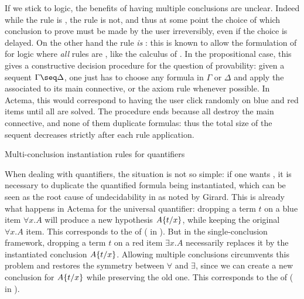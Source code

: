 If we stick to  logic, the benefits of having multiple conclusions
are unclear. Indeed while the {} rule is , the
{} rule is not, and thus at some point the choice of which
conclusion to prove must be made by the user irreversibly, even if the choice is
delayed. On the other hand the
{} rule \emph{is} : this is known to allow the
formulation of  for  logic where \emph{all} rules are
, like the  calculus of . In
the propositional case, this gives a constructive decision procedure for the
question of provability: given a sequent $\Gamma \seq \Delta$, one just has to
choose any formula in $\Gamma$ or $\Delta$ and apply the 
associated to its main connective, or the axiom rule whenever possible. In
Actema, this would correspond to having the user click randomly on blue and red
items until all  are solved. The procedure ends because all  destroy the main connective, and none of them duplicate formulas: thus the
total size of the sequent decreases strictly after each rule application.

\begin{marginfigure}
  \caption{Multi-conclusion instantiation rules for quantifiers}
\end{marginfigure}

When dealing with quantifiers, the situation is not so simple: if one wants
 , it is necessary to duplicate the quantified
formula being instantiated, which can be seen as the root cause of
undecidability in  as noted by
Girard\cite[Section~3.3.2]{girard:hal-01322183}. This is already what happens in
Actema for the universal quantifier: dropping a term $t$ on a blue item $\forall
x. A$ will produce a new hypothesis $A \{ t / x \}$, while keeping the
original $\forall x. A$ item. This corresponds to the 
 of  ({} in ).
But in the single-conclusion framework, dropping a term $t$ on a red item
$\exists x. A$ necessarily replaces it by the instantiated conclusion
$A \{ t / x \}$. Allowing multiple conclusions circumvents this problem and
restores the symmetry between $\forall$ and $\exists$, since we can create a new
conclusion for $A \{ t / x \}$ while preserving the old one. This corresponds
to the   of  ({} in
).

